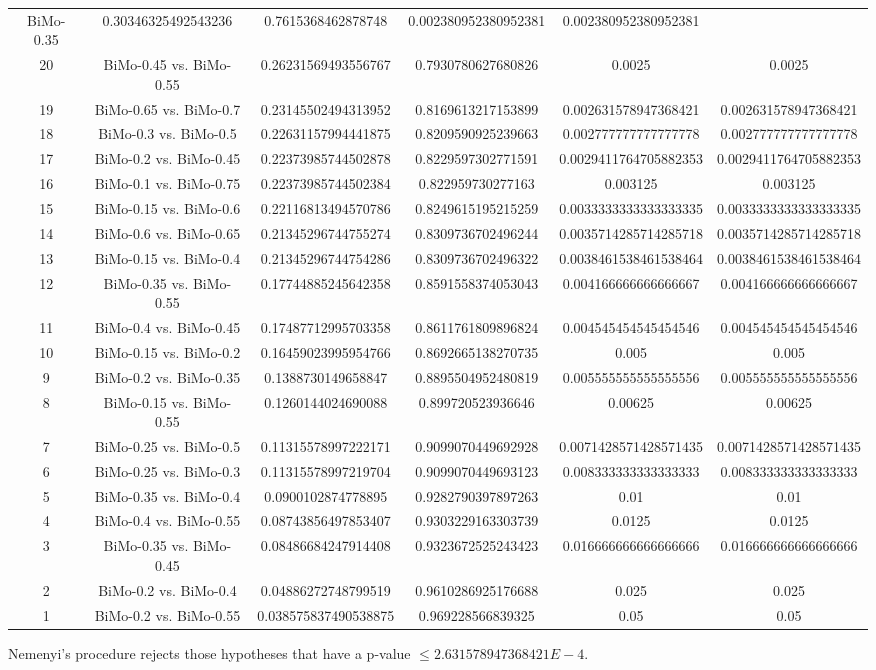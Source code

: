 \documentclass[a4paper,10pt]{article}
\begin{document}
\begin{landscape}
\begin{table}[!htp]
\begin{tabular}{cccccc}
BiMo-0.35&0.30346325492543236&0.7615368462878748&0.002380952380952381&0.002380952380952381\\20&BiMo-0.45 vs. BiMo-0.55&0.26231569493556767&0.7930780627680826&0.0025&0.0025\\19&BiMo-0.65 vs. BiMo-0.7&0.23145502494313952&0.8169613217153899&0.002631578947368421&0.002631578947368421\\18&BiMo-0.3 vs. BiMo-0.5&0.22631157994441875&0.8209590925239663&0.002777777777777778&0.002777777777777778\\17&BiMo-0.2 vs. BiMo-0.45&0.22373985744502878&0.8229597302771591&0.0029411764705882353&0.0029411764705882353\\16&BiMo-0.1 vs. BiMo-0.75&0.22373985744502384&0.822959730277163&0.003125&0.003125\\15&BiMo-0.15 vs. BiMo-0.6&0.22116813494570786&0.8249615195215259&0.0033333333333333335&0.0033333333333333335\\14&BiMo-0.6 vs. BiMo-0.65&0.21345296744755274&0.8309736702496244&0.0035714285714285718&0.0035714285714285718\\13&BiMo-0.15 vs. BiMo-0.4&0.21345296744754286&0.8309736702496322&0.0038461538461538464&0.0038461538461538464\\12&BiMo-0.35 vs. BiMo-0.55&0.17744885245642358&0.8591558374053043&0.004166666666666667&0.004166666666666667\\11&BiMo-0.4 vs. BiMo-0.45&0.17487712995703358&0.8611761809896824&0.004545454545454546&0.004545454545454546\\10&BiMo-0.15 vs. BiMo-0.2&0.16459023995954766&0.8692665138270735&0.005&0.005\\9&BiMo-0.2 vs. BiMo-0.35&0.1388730149658847&0.8895504952480819&0.005555555555555556&0.005555555555555556\\8&BiMo-0.15 vs. BiMo-0.55&0.1260144024690088&0.899720523936646&0.00625&0.00625\\7&BiMo-0.25 vs. BiMo-0.5&0.11315578997222171&0.9099070449692928&0.0071428571428571435&0.0071428571428571435\\6&BiMo-0.25 vs. BiMo-0.3&0.11315578997219704&0.9099070449693123&0.008333333333333333&0.008333333333333333\\5&BiMo-0.35 vs. BiMo-0.4&0.0900102874778895&0.9282790397897263&0.01&0.01\\4&BiMo-0.4 vs. BiMo-0.55&0.08743856497853407&0.9303229163303739&0.0125&0.0125\\3&BiMo-0.35 vs. BiMo-0.45&0.08486684247914408&0.9323672525243423&0.016666666666666666&0.016666666666666666\\2&BiMo-0.2 vs. BiMo-0.4&0.04886272748799519&0.9610286925176688&0.025&0.025\\1&BiMo-0.2 vs. BiMo-0.55&0.038575837490538875&0.969228566839325&0.05&0.05\\\hline
\end{tabular}
\end{table}
Nemenyi's procedure rejects those hypotheses that have a p-value $\le2.631578947368421E-4$.



\end{landscape}
\end{document}
